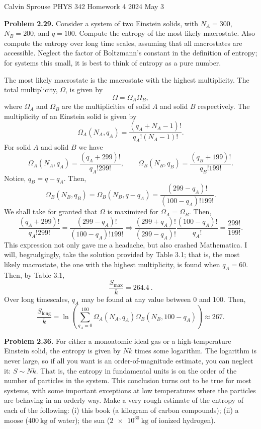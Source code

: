 \documentclass[a4paper, 12pt]{config/homework}
\begin{document}
\noindent
\hfill Calvin Sprouse \hfill PHYS 342 Homework 4 \hfill 2024 May 3 \hfill

\bigskip\noindent
\textbf{Problem 2.29.} Consider a system of two Einstein solids, with \(N_A=300\), \(N_B=200\), and \(q=100\). Compute the entropy of the most likely macrostate. Also compute the entropy over long time scales, assuming that all macrostates are accessible. Neglect the factor of Boltzmann's constant in the definition of entropy; for systems this small, it is best to think of entropy as a pure number.

\noindent
The most likely macrostate is the macrostate with the highest multiplicity. The total multiplicity, \(\Omega\), is given by
\[\Omega = \Omega_A \Omega_B,\]
where \(\Omega_A\) and \(\Omega_B\) are the multiplicities of solid \(A\) and solid \(B\) respectively. The multiplicity of an Einstein solid is given by
\[\Omega_A(N_A,q_A) = \frac{\left(q_A+N_A-1\right)!}{q_A!\left(N_A-1\right)!}.\]
For solid \(A\) and solid \(B\) we have
\[\Omega_A(N_A, q_A) = \frac{\left(q_A + 299\right)!}{q_A!299!}, \qquad
\Omega_B(N_B, q_B) = \frac{\left(q_B + 199\right)!}{q_B!199!}.\]
Notice, \(q_B = q - q_A\). Then,
\[\Omega_B(N_B, q_B) = \Omega_B(N_B, q-q_A) = \frac{\left(299 - q_A\right)!}{(100-q_A)!199!}.\]
We shall take for granted that \(\Omega\) is maximized for \(\Omega_A = \Omega_B\). Then,
\[\frac{\left(q_A + 299\right)!}{q_A!299!} = \frac{\left(299 - q_A\right)!}{(100-q_A)!199!}
\Rightarrow
\frac{\left(299 + q_A\right)!}{\left(299 - q_A\right)!} \frac{\left(100 - q_A\right)!}{q_A!}
= \frac{299!}{199!}.\]
This expression not only gave me a headache, but also crashed Mathematica. I will, begrudgingly, take the solution provided by Table 3.1; that is, the most likely macrostate, the one with the highest multiplicity, is found when \(q_A=60\). Then, by Table 3.1,
\[\frac{S_{\text{max}}}{k} = \qty{264.4}{}.\]
Over long timescales, \(q_A\) may be found at any value between 0 and 100. Then,
\[\frac{S_{\text{long}}}{k} = \ln\left(\sum_{q_A=0}^{100}\Omega_A(N_A,q_A)\Omega_B(N_B,100-q_A)\right) \approx 267.\]

\pagebreak
\noindent
\textbf{Problem 2.36.} For either a monoatomic ideal gas or a high-temperature Einstein solid, the entropy is given by \(Nk\) times some logarithm. The logarithm is never large, so if all you want is an order-of-magnitude estimate, you can neglect it: \(S \sim Nk\). That is, the entropy in fundamental units is on the order of the number of particles in the system. This conclusion turns out to be true for most systems, with some important exceptions at low temperatures where the particles are behaving in an orderly way. Make a very rough estimate of the entropy of each of the following: (i) this book (a kilogram of carbon compounds); (ii) a moose (\(\qty{400}{\kg}\) of water); the sun (\(\qty{2e30}{\kg}\) of ionized hydrogen).
\end{document}
